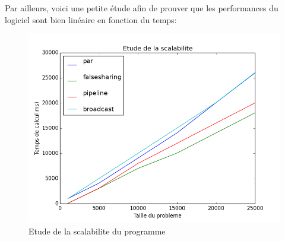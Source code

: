 Par ailleurs, voici une petite étude afin de prouver que les performances du logiciel sont bien linéaire en fonction du temps: \\

\begin{figure}[!h]
\begin{center}
   \includegraphics[scale=0.40]{images/scalability.png}
   \caption{\label{img:inclusifs} Etude de la scalabilite du programme}
\end{center}
\end{figure}
